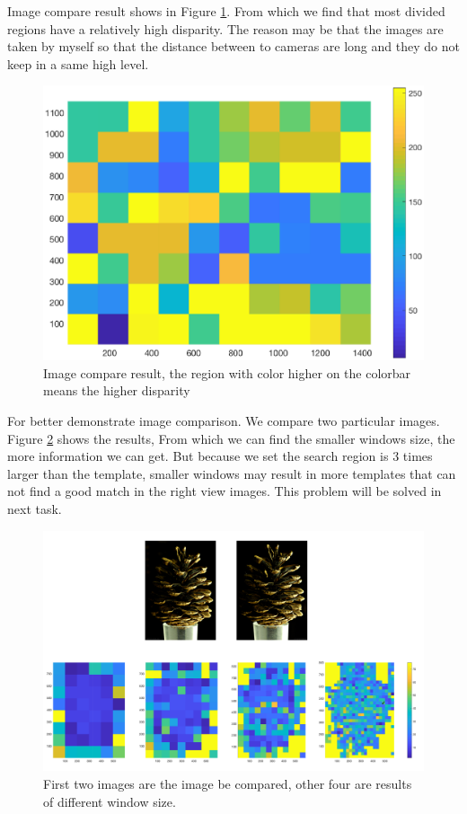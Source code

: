 Image compare result shows in Figure \ref{fig:img_cmp}. From which we find that most divided regions have a relatively high disparity. The reason may be that the images are taken by myself so that the distance between to cameras are long and they do not keep in a same high level.

\begin{figure}[h!]
	\centering
	\includegraphics[width=0.5\linewidth]{figures/part2/img_cmp}
	\caption{Image compare result, the region with color higher on the colorbar means the higher disparity}
	\label{fig:img_cmp}
\end{figure}

For better demonstrate image comparison. We compare two particular images. Figure \ref{fig:img_cmp1} shows the results, From which we can find the smaller windows size, the more information we can get. But because we set the search region is 3 times larger than the template, smaller windows may result in more templates that can not find a good match in the right view images. This problem will be solved in next task.

\begin{figure}[h!]
	\centering
	\includegraphics[width=1\linewidth]{figures/part2/img_cmp1}
	\caption{First two images are the image be compared, other four are results of different window size.}
	\label{fig:img_cmp1}
\end{figure}

